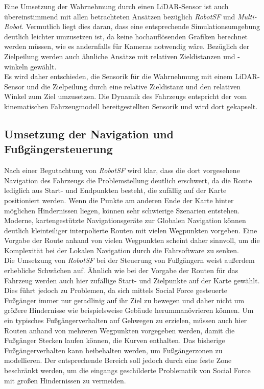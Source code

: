 Eine Umsetzung der Wahrnehmung durch einen LiDAR-Sensor ist auch übereinstimmend mit allen
betrachteten Ansätzen bezüglich \emph{RobotSF} und \emph{Multi-Robot}. Vermutlich liegt
dies daran, dass eine entsprechende Simulationsumgebung deutlich leichter umzusetzen ist,
da keine hochauflösenden Grafiken berechnet werden müssen, wie es andernfalls für Kameras
notwendig wäre. Bezüglich der Zielpeilung werden auch ähnliche Ansätze mit relativen
Zieldistanzen und -winkeln gewählt.\\

Es wird daher entschieden, die Sensorik für die Wahrnehmung mit einem LiDAR-Sensor
und die Zielpeilung durch eine relative Zieldistanz und den relativen Winkel zum Ziel
umzusetzen. Die Dynamik des Fahrzeugs entspricht der vom kinematischen Fahrzeugmodell
bereitgestellten Sensorik und wird dort gekapselt.

\subsection{Umsetzung der Navigation und Fußgängersteuerung}
Nach einer Begutachtung von \emph{RobotSF} wird klar, dass die dort vorgesehene Navigation
des Fahrzeugs die Problemstellung deutlich erschwert, da die Route lediglich aus Start-
und Endpunkten besteht, die zufällig auf der Karte positioniert werden. Wenn die Punkte
am anderen Ende der Karte hinter möglichen Hindernissen liegen, können sehr schwierige
Szenarien entstehen. Moderne, kartengestützte Navigationsgeräte zur Globalen Navigation
können deutlich kleinteiliger interpolierte Routen mit vielen Wegpunkten vorgeben.
Eine Vorgabe der Route anhand von vielen Wegpunkten scheint daher sinnvoll, um die
Komplexität bei der Lokalen Navigation durch die Fahrsoftware zu senken.\\

Die Umsetzung von \emph{RobotSF} bei der Steuerung von Fußgängern weist außerdem
erhebliche Schwächen auf. Ähnlich wie bei der Vorgabe der Routen für das Fahrzeug werden
auch hier zufällige Start- und Zielpunkte auf der Karte gewählt. Dies führt jedoch
zu Problemen, da sich mittels Social Force gesteuerte Fußgänger immer nur geradlinig
auf ihr Ziel zu bewegen und daher nicht um größere Hindernisse wie beispielsweise Gebäude
herummanövrieren können. Um ein typisches Fußgängerverhalten auf Gehwegen zu erzielen,
müssen auch hier Routen anhand von mehreren Wegpunkten vorgegeben werden, damit die Fußgänger
Stecken laufen können, die Kurven enthalten. Das bisherige Fußgängerverhalten kann
beibehalten werden, um Fußgängerzonen zu modellieren. Der entsprechende Bereich soll jedoch
durch eine feste Zone beschränkt werden, um die eingangs geschilderte Problematik von
Social Force mit großen Hindernissen zu vermeiden.\\

